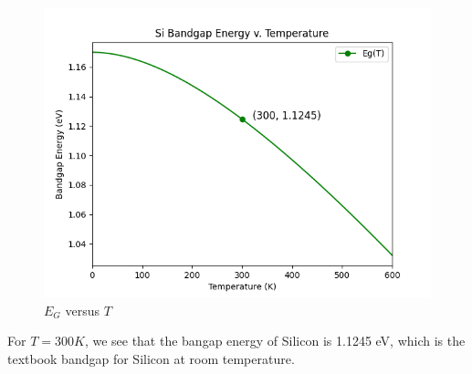 \documentclass{article}
\begin{document}
\begin{figure}[!h] 
    \centering
    \includegraphics[width = 15cm]{bandgapTempPlot.png}
    \caption{\(E_G\) versus \(T\)}
    \label{fig:bandgapTemp}
\end{figure}

For \(T = 300K\), we see that the bangap energy of Silicon is 1.1245 eV, which is the textbook bandgap for Silicon at room temperature.
\end{document}
